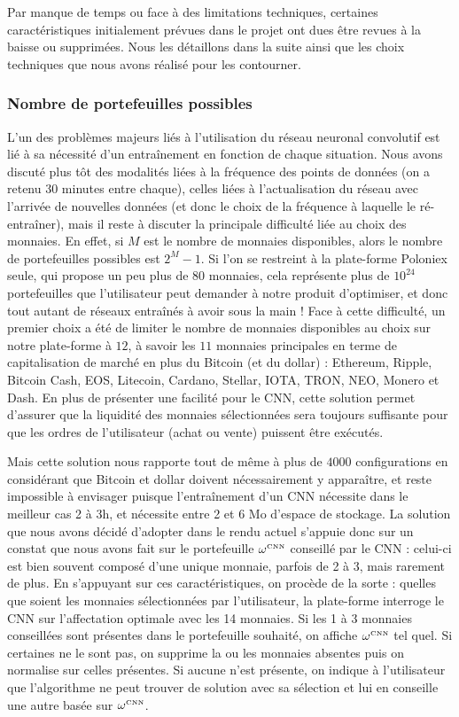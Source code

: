 \documentclass[a4paper, 10pt]{article}
\begin{document}
Par manque de temps ou face à des limitations techniques, certaines caractéristiques initialement prévues dans le projet ont dues être revues à la baisse ou supprimées. Nous les détaillons dans la suite ainsi que les choix techniques que nous avons réalisé pour les contourner.

\subsubsection{Nombre de portefeuilles possibles}
\label{sec:developpement_limites_portfolio}

L'un des problèmes majeurs liés à l'utilisation du réseau neuronal convolutif est lié à sa nécessité d'un entraînement en fonction de chaque situation. Nous avons discuté plus tôt des modalités liées à la fréquence des points de données (on a retenu 30 minutes entre chaque), celles liées à l'actualisation du réseau avec l'arrivée de nouvelles données (et donc le choix de la fréquence à laquelle le ré-entraîner), mais il reste à discuter la principale difficulté liée au choix des monnaies. En effet, si $M$ est le nombre de monnaies disponibles, alors le nombre de portefeuilles possibles est $2^M - 1$. Si l'on se restreint à la plate-forme Poloniex seule, qui propose un peu plus de 80 monnaies, cela représente plus de $10^{24}$ portefeuilles que l'utilisateur peut demander à notre produit d'optimiser, et donc tout autant de réseaux entraînés à avoir sous la main ! Face à cette difficulté, un premier choix a été de limiter le nombre de monnaies disponibles au choix sur notre plate-forme à $12$, à savoir les $11$ monnaies principales en terme de capitalisation de marché en plus du Bitcoin (et du dollar) : Ethereum, Ripple, Bitcoin Cash, EOS, Litecoin, Cardano, Stellar, IOTA, TRON, NEO, Monero et Dash. En plus de présenter une facilité pour le CNN, cette solution permet d'assurer que la liquidité des monnaies sélectionnées sera toujours suffisante pour que les ordres de l'utilisateur (achat ou vente) puissent être exécutés.

Mais cette solution nous rapporte tout de même à plus de $4000$ configurations en considérant que Bitcoin et dollar doivent nécessairement y apparaître, et reste impossible à envisager puisque l'entraînement d'un CNN nécessite dans le meilleur cas 2 à 3h, et nécessite entre 2 et 6 Mo d'espace de stockage. La solution que nous avons décidé d'adopter dans le rendu actuel s'appuie donc sur un constat que nous avons fait sur le portefeuille $\omega^{\text{\tiny CNN}}$ conseillé par le CNN : celui-ci est bien souvent composé d'une unique monnaie, parfois de 2 à 3, mais rarement de plus. En s'appuyant sur ces caractéristiques, on procède de la sorte : quelles que soient les monnaies sélectionnées par l'utilisateur, la plate-forme interroge le CNN sur l'affectation optimale avec les 14 monnaies. Si les 1 à 3 monnaies conseillées sont présentes dans le portefeuille souhaité, on affiche $\omega^{\text{\tiny CNN}}$ tel quel. Si certaines ne le sont pas, on supprime la ou les monnaies absentes puis on normalise sur celles présentes. Si aucune n'est présente, on indique à l'utilisateur que l'algorithme ne peut trouver de solution avec sa sélection et lui en conseille une autre basée sur $\omega^{\text{\tiny CNN}}$.
\end{document}
